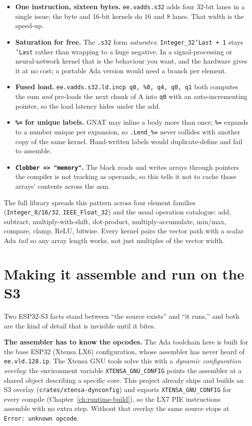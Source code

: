 \begin{itemize}
\item \textbf{One instruction, sixteen bytes.} \texttt{ee.vadds.s32} adds four
  32-bit lanes in a single issue; the byte and 16-bit kernels do 16 and 8 lanes.
  That width is the speed-up.
\item \textbf{Saturation for free.} The \texttt{.s32} form \emph{saturates}:
  \texttt{Integer\_32'Last + 1} stays \texttt{'Last} rather than wrapping to a huge
  negative. In a signal-processing or neural-network kernel that is the behaviour you
  want, and the hardware gives it at no cost; a portable Ada version would need a
  branch per element.
\item \textbf{Fused load. } \texttt{ee.vadds.s32.ld.incp q0, \%0, q4, q0, q1}
  both computes the sum \emph{and} pre-loads the next chunk of A into \texttt{q0}
  with an auto-incrementing pointer, so the load latency hides under the add.
\item \textbf{\texttt{\%=} for unique labels.} GNAT may inline a body more than once;
  \texttt{\%=} expands to a number unique per expansion, so \texttt{.Lend\_\%=}
  never collides with another copy of the same kernel. Hand-written labels would
  duplicate-define and fail to assemble.
\item \textbf{\texttt{Clobber => "memory"}.} The block reads and writes arrays
  through pointers the compiler is not tracking as operands, so this tells it not to
  cache those arrays' contents across the asm.
\end{itemize}

The full library spreads this pattern across four element families
(\texttt{Integer\_8/16/32}, \texttt{IEEE\_Float\_32}) and the usual operation
catalogue: add, subtract, multiply-with-shift, dot-product, multiply-accumulate,
min/max, compare, clamp, ReLU, bitwise. Every kernel pairs the vector path with a
scalar Ada \emph{tail} so any array length works, not just multiples of the vector
width.

\section{Making it assemble and run on the S3}

Two ESP32-S3 facts stand between ``the source exists'' and ``it runs,'' and both are
the kind of detail that is invisible until it bites.

\textbf{The assembler has to know the opcodes.} The Ada toolchain here is built for
the base ESP32 (Xtensa LX6) configuration, whose assembler has never heard of
\texttt{ee.vld.128.ip}. The Xtensa GNU tools solve this with a \emph{dynamic
configuration overlay}: the environment variable \texttt{XTENSA\_GNU\_CONFIG} points
the assembler at a shared object describing a specific core. This project already
ships and builds an S3 overlay (\texttt{crates/xtensa-dynconfig}) and exports
\texttt{XTENSA\_GNU\_CONFIG} for every compile (Chapter~\ref{ch:runtime-build}), so
the LX7 PIE instructions assemble with no extra step. Without that overlay the same
source stops at \texttt{Error: unknown opcode}.

